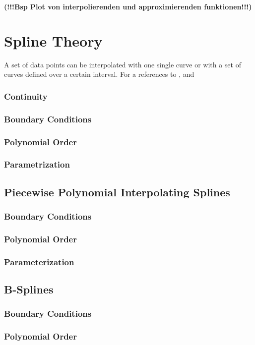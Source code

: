 \textbf{(!!!Bsp Plot von interpolierenden und approximierenden funktionen!!!)}


\section{Spline Theory}
A set of data points can be interpolated with one single curve or with a set of curves defined over a certain interval.  For a 
\label{sec:splineTheory}
references to \cite{engeln}, \cite{biagiotti} and \cite{doessegger}
\subsubsection{Continuity}
\subsubsection{Boundary Conditions}
\subsubsection{Polynomial Order}
\subsubsection{Parametrization}
\subsection{Piecewise Polynomial Interpolating Splines}
\subsubsection{Boundary Conditions}
\subsubsection{Polynomial Order}
\subsubsection{Parameterization}
\subsection{B-Splines}
\subsubsection{Boundary Conditions}
\subsubsection{Polynomial Order}
